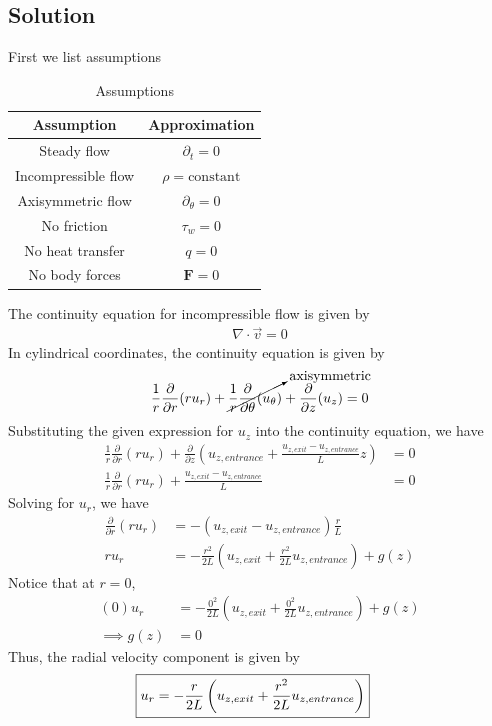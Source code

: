 \subsection*{Solution}
First we list assumptions
\begin{table}[h]
    \centering
    \caption{Assumptions}
    \begin{tabular}{c|c}
        Assumption & Approximation \\
        \hline
        Steady flow & $\partial_t = 0$ \\
        Incompressible flow & $\rho = \text{constant}$ \\
        Axisymmetric flow & $\partial_{\theta} = 0$ \\
        No friction & $\tau_{w} = 0$ \\
        No heat transfer & $q = 0$ \\
        No body forces & $\mathbf{F} = 0$ \\
    \end{tabular}
\end{table}
\FloatBarrier
The continuity equation for incompressible flow is given by
\begin{align*}
    \nabla \cdot \vec{v} = 0
\end{align*}
In cylindrical coordinates, the continuity equation is given by
\begin{align*}
    \frac{1}{r} \frac{\partial}{\partial r}(r u_r) + \cancelto{\text{axisymmetric}}{\frac{1}{r}\frac{\partial}{\partial \theta}(u_{\theta})} + \frac{\partial}{\partial z}(u_z) &= 0 \\
\end{align*}
Substituting the given expression for $u_z$ into the continuity equation, we have
\begin{align*}
    \frac{1}{r} \frac{\partial}{\partial r}(r u_r) + \frac{\partial}{\partial z}\left(u_{z,entrance} + \frac{u_{z,exit} - u_{z,entrance}}{L}z\right) &= 0 \\
    \frac{1}{r} \frac{\partial}{\partial r}(r u_r) + \frac{u_{z,exit} - u_{z,entrance}}{L} &= 0 
\end{align*}
Solving for $u_r$, we have
\begin{align*}
    \frac{\partial}{\partial r}(r u_r) &= -\left(u_{z,exit} - u_{z,entrance}\right)\frac{r}{L} \\
    r u_r &= -\frac{r^2}{2L}\left(u_{z,exit} + \frac{r^2}{2L}u_{z,entrance}\right) + g(z) 
\end{align*}
Notice that at $r=0$, 
\begin{align*}
    (0)u_r &= -\frac{0^2}{2L}\left(u_{z,exit} + \frac{0^2}{2L}u_{z,entrance}\right) + g(z) \\
    \implies g(z) &= 0
\end{align*}
Thus, the radial velocity component is given by
\begin{align*}
    \Aboxed{u_r &= -\frac{r}{2L}\left(u_{z,exit} + \frac{r^2}{2L}u_{z,entrance}\right)}
\end{align*}
